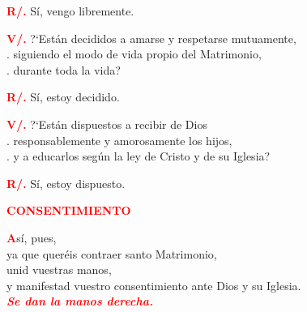 \documentclass[12pt, letterpaper]{report}
\begin{document}
\Large \hspace{-0.9cm} {\bfseries \textcolor{red}{R/.}} \hspace{0.5cm} S\'i, vengo libremente. \newline

\Large \hspace{-0.9cm}  {\bfseries \textcolor{red}{V/.}} \hspace{0.5cm} ?`Est\'an decididos a amarse y respetarse mutuamente, \\
. \hspace{1cm} siguiendo el modo de vida propio del Matrimonio, \\
. \hspace{1cm} durante toda la vida? \newline

\Large \hspace{-0.9cm} {\bfseries \textcolor{red}{R/.}} \hspace{0.5cm} S\'i, estoy decidido. \newline

\Large \hspace{-0.9cm} {\bfseries \textcolor{red}{V/.}} \hspace{0.5cm} ?`Est\'an dispuestos a recibir de Dios \\
. \hspace{1cm} responsablemente y amorosamente los hijos, \\
. \hspace{1cm} y a educarlos seg\'un la ley de Cristo y de su Iglesia? \newline

\Large \hspace{-0.9cm} {\bfseries \textcolor{red}{R/.}} \hspace{0.5cm} S\'i, estoy dispuesto. \newline

\newpage

\Large {\bfseries \textcolor{red}{CONSENTIMIENTO}}

\lettrine[lines=1]{\bfseries \textcolor{red}{A}}{}\Large s\'i, pues, \\
ya que quer\'eis contraer santo Matrimonio, \\
unid vuestras manos, \\
y manifestad vuestro consentimiento ante Dios y su Iglesia.\\

{\bfseries \textcolor{red}{ \em Se dan la manos derecha.}} \newline
\end{document}
